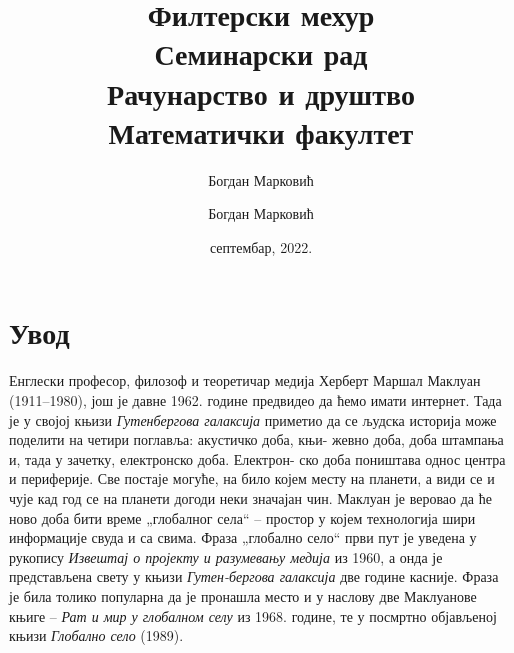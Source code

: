\documentclass[a4paper]{article}
\author{Богдан Марковић}
\begin{document}
\title{Филтерски мехур\\ 

\bigskip
\small{Семинарски рад
\\Рачунарство и друштво
\\ Математички факултет}}

\author{Богдан Марковић}
\date{септембар, 2022.}
\maketitle


\newpage

\tableofcontents

\newpage

\section{Увод}
\label{sec:uvod}
Енглески професор, филозоф и теоретичар медија Херберт Маршал Маклуан (1911–1980), још је давне 1962. године предвидео да ћемо имати интернет. Тада је у својој књизи \emph{Гутенбергова галаксија} приметио да се људска историја може поделити на четири поглавља: акустичко доба, књи-
жевно доба, доба штампања и, тада у зачетку, електронско доба\cite{macluhan}. Електрон-
ско доба поништава однос центра и периферије. Све постаје могуће, на било којем месту на планети, а види се и чује кад год се на планети догоди неки значајан чин. Маклуан је веровао да ће ново доба бити време „глобалног села“ – простор у којем технологија шири информације свуда и са свима. Фраза „глобално село“ први пут је уведена у рукопису \emph{Извештај о пројекту и разумевању медија} из 1960, а онда је представљена свету у књизи \emph{Гутен-бергова галаксија} две године касније. Фраза је била толико популарна да је пронашла место и у наслову две Маклуанове књиге – \emph{Рат и мир у глобалном селу} из 1968. године, те у посмртно објављеној књизи \emph{Глобално село} (1989).
\end{document}
